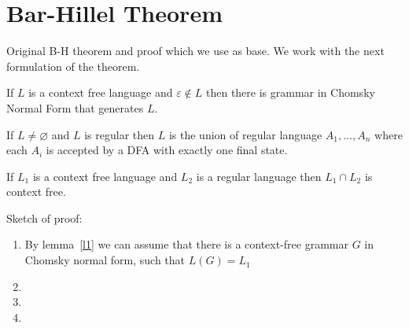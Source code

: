 \section{Bar-Hillel Theorem}

Original B-H theorem and proof which we use as base.
We work with the next formulation of the theorem.

\begin{lemma}\label{l1}
If $L$ is a context free language and $\varepsilon \notin L$ then there is grammar in Chomsky Normal Form that generates $L$.
\end{lemma}

\begin{lemma}\label{l2}
If $L \neq \varnothing $ and $L$ is regular then $L$ is the union of regular language $A_1, \ldots , A_n$ where each $A_i$ is accepted by a DFA with exactly one final state.
\end{lemma}

\begin{theorem}
If $L_1$ is a context free language and $L_2$ is a regular language then $L_1 \cap L_2$ is context
free.

\end{theorem}

Sketch of proof:
\begin{enumerate}
\item By lemma~\ref{l1} we can assume that there is a context-free grammar $G$ in Chomsky normal form, such that $L(G) = L_1$
\item  
\item 
\item
\end{enumerate}


